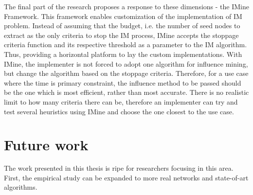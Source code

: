 	The final part of the research proposes a response to these dimensions - the IMine Framework. This framework enables customization of the implementation of IM problem. Instead of assuming that the budget, i.e. the number of seed nodes to extract as the only criteria to stop the IM process, IMine accepts the stoppage criteria function and its respective threshold as a parameter to the IM algorithm. Thus, providing a horizontal platform to lay the custom implementations. With IMine, the implementer is not forced to adopt one algorithm for influence mining, but change the algorithm based on the stoppage criteria. Therefore, for a use case where the time is primary constraint, the influence method to be passed should be the one which is most efficient, rather than most accurate. There is no realistic limit to how many criteria there can be, therefore an implementer can try and test several heuristics using IMine and choose the one closest to the use case.
	
	\section{Future work}
	The work presented in this thesis is ripe for researchers focusing in this area. First, the empirical study can be expanded to more real networks and state-of-art algorithms.
	
